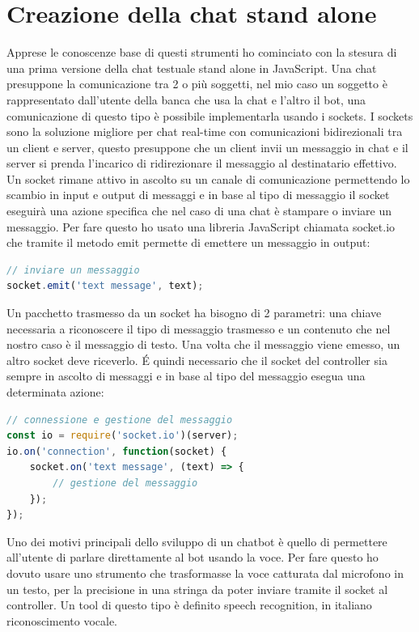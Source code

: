 \section{Creazione della chat stand alone}
Apprese le conoscenze base di questi strumenti ho cominciato con la stesura di una prima versione della chat testuale stand alone in JavaScript. Una chat presuppone la comunicazione tra 2 o più soggetti, nel mio caso un soggetto è rappresentato dall'utente della banca che usa la chat e l'altro il bot, una comunicazione di questo tipo è possibile implementarla usando i sockets.
I sockets sono la soluzione migliore per chat real-time con comunicazioni bidirezionali tra un client e server, questo presuppone che un client invii un messaggio in chat e il server si prenda l'incarico di ridirezionare il messaggio al destinatario effettivo. Un socket rimane attivo in ascolto su un canale di comunicazione permettendo lo scambio in input e output di messaggi e in base al tipo di messaggio il socket eseguirà una azione specifica che nel caso di una chat è stampare o inviare un messaggio. Per fare questo ho usato una libreria JavaScript chiamata socket.io  che tramite il metodo emit permette di emettere un messaggio in output:
\begin{lstlisting}[language=JavaScript]
// inviare un messaggio
socket.emit('text message', text);
\end{lstlisting}

Un pacchetto trasmesso da un socket ha bisogno di 2 parametri: una chiave necessaria a riconoscere il tipo di messaggio trasmesso e un contenuto che nel nostro caso è il messaggio di testo.
Una volta che il messaggio viene emesso, un altro socket deve riceverlo. \'{E} quindi necessario che il socket del controller sia sempre in ascolto di messaggi e in base al tipo del messaggio esegua una determinata azione:
\begin{lstlisting}[language=JavaScript]
// connessione e gestione del messaggio
const io = require('socket.io')(server);
io.on('connection', function(socket) {
    socket.on('text message', (text) => {
        // gestione del messaggio
    });
});
\end{lstlisting}

Uno dei motivi principali dello sviluppo di un chatbot è quello di permettere all'utente di parlare direttamente al bot usando la voce. Per fare questo ho dovuto usare uno strumento che trasformasse la voce catturata dal microfono in un testo, per la precisione in una stringa da poter inviare tramite il socket al controller. Un tool di questo tipo è definito speech recognition, in italiano riconoscimento vocale.
